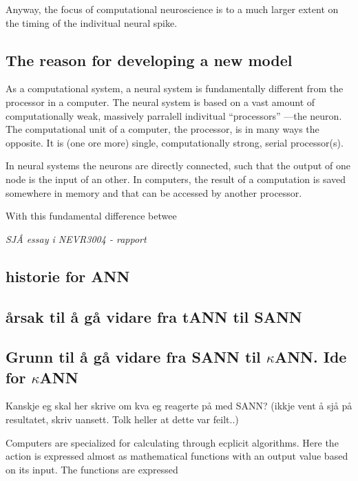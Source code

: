 Anyway, the focus of computational neuroscience is to a much larger extent on the timing of the indivitual neural spike. 




\subsection{The reason for developing a new model}
As a computational system, a neural system is fundamentally different from the processor in a computer. 
The neural system is based on a vast amount of computationally weak, massively parralell indivitual ``processors'' ---the neuron. 
The computational unit of a computer, the processor, is in many ways the opposite. It is (one ore more) single, computationally strong, serial processor(s). 

In neural systems the neurons are directly connected, such that the output of one node is the input of an other. In computers, the result of a computation is saved somewhere in memory and that can be accessed by another processor.

With this fundamental difference betwee



\newpage
		\emph{SJÅ essay i NEVR3004 - rapport}

	\subsection{historie for ANN}


	\subsection{årsak til å gå vidare fra tANN til SANN}
	\subsection{Grunn til å gå vidare fra SANN til $\kappa$ANN. Ide for $\kappa$ANN}
		Kanskje eg skal her skrive om kva eg  reagerte på med SANN? (ikkje vent å sjå på resultatet, skriv uansett. Tolk heller at dette var feilt..)







Computers are specialized for calculating through ecplicit algorithms. Here the action is expressed almost as mathematical functions with an output value based on its input. 
The functions are expressed 

